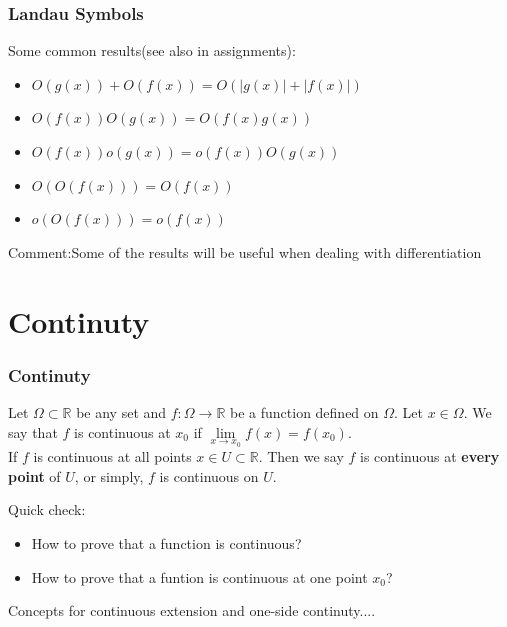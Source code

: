 \documentclass{beamer}
\begin{document}
\begin{frame}
    \frametitle{Landau Symbols}
    Some common results(see also in assignments):
    \begin{itemize}
        \item $O(g(x))+O(f(x))=O(|g(x)|+|f(x)|)$
        \item $O(f(x))𝑂(g(x))=𝑂(f(x)g(x))$
        \item $O(f(x))o(g(x))=o(f(x))𝑂(g(x))$
        \item $O(O(f(x)))=O(f(x))$
        \item $o(O(f(x)))=o(f(x))$
    \end{itemize}
    \vspace{3em}
    Comment:Some of the results will be useful when dealing with differentiation
\end{frame}
\section{Continuty}
\begin{frame}
    \frametitle{Continuty}
    Let $\Omega\subset \mathbb{R}$ be any set and $f:\Omega\to \mathbb{R}$ be a function defined on $\Omega$. 
    Let $x \in \Omega$. We say that $f$ is continuous at $x_0$ if $\underset{x\to x_0}{\lim} ⁡f(x)=f(x_0)$.\\
    \vspace{2em} 
	If $f$ is continuous at all points $x \in U\subset \mathbb{R}$. 
    Then we say $f$ is continuous at \textbf{every point} of $U$, or simply, 
    $f$ is continuous on $U$. 
    \vspace{2em}
    \begin{block}{Quick check:}
        \begin{itemize}
            \item How to prove that a function is continuous?
            \item How to prove that a funtion is continuous at one point $x_0$?
        \end{itemize}
    \end{block}
    Concepts for continuous extension and one-side continuty....
\end{frame}
\end{document}
